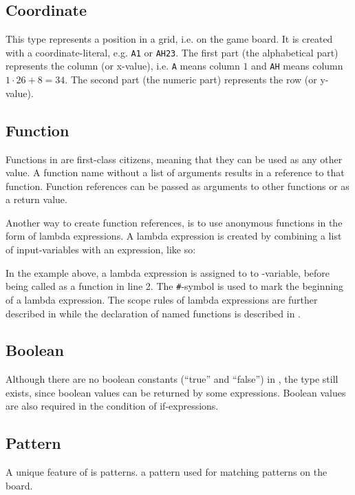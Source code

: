 
\subsection{Coordinate}
This type represents a position in a grid, i.e. on the game board. It is created with
a coordinate-literal, e.g. \texttt{A1} or \texttt{AH23}. The first part (the alphabetical part)
represents the column (or x-value), i.e. \texttt{A} means column $1$ and \texttt{AH} means
column $1 \cdot 26 + 8 = 34$. The second part (the numeric part) represents the row (or y-value).


\subsection{Function}
Functions in \productname{} are first-class citizens, meaning that they can be used as any
other value. A function name without a list of arguments results in a reference to that
function. Function references can be passed as arguments to other functions or as a return
value.

Another way to create function references, is to use anonymous functions in the form
of lambda expressions. A lambda expression is created by combining a list of input-variables
with an expression, like so:


In the example above, a lambda expression is assigned to to -variable, before
being called as a function in line 2. The \texttt{\#}-symbol is used to mark the beginning
of a lambda expression. The scope rules of lambda expressions are further described in 
while the declaration of named functions is described in .

\subsection{Boolean}
Although there are no boolean constants (``true'' and ``false'') in \productname, the type still exists, since
boolean values can be returned by some expressions. Boolean values are also required in the condition of
if-expressions.

\subsection{Pattern}
A unique feature of \productname{} is patterns.
a pattern used for matching patterns on the board.

